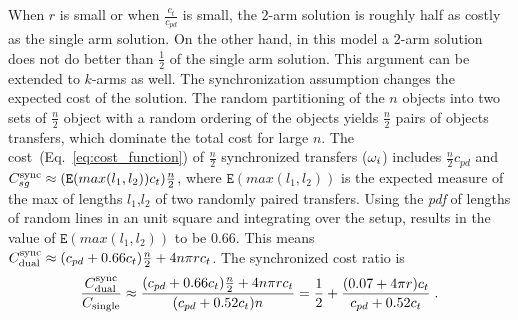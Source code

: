 When $r$ is small or when $\frac{c_t}{c_{pd}}$ is small, the $2$-arm 
solution is roughly half as costly as the single arm solution. On 
the other hand, in this model a $2$-arm solution does not do better than $\frac{1}{2}$ of 
the single arm 
solution. This argument can be extended to $k$-arms as well.
\vspace{-0.08in}
The synchronization assumption changes the expected cost of the solution. The random partitioning of the $n$ objects into two sets of $\frac{n}{2}$ object with a random ordering of the objects yields $\frac{n}{2}$ pairs of objects transfers, which dominate the total cost for large $n$. The cost~(Eq.~\ref{eq:cost_function}) of $\frac{n}{2}$ synchronized transfers (${\omega}_i$) includes $\frac{n}{2}c_{pd}$ and $C^{\rm sync}_{sg} \approx (\mathtt{E}(max(l_1,l_2))c_t)\frac{n}{2}$, where $\mathtt{E}(max(l_1,l_2))$ is the expected measure of the max of lengths $l_1$,$l_2$ of two randomly paired transfers. Using the \textit{pdf}\cite{ghosh1951random} of lengths of random lines in an unit square and integrating over the setup, results in the value of $\mathtt{E}(max(l_1,l_2))$ to be $0.66$. 
This means $C_{\rm dual}^{\rm sync} \approx (c_{pd} + 0.66c_t)\frac{n}{2} + 4n\pi rc_t$.
The synchronized cost ratio is
\vspace{-0.1in}
\begin{equation}\label{eq:synchronized-ratio}
\frac{C_{\rm dual}^{\rm sync}}{C_{\rm single}} \approx 
\frac{(c_{pd} + 0.66c_t)\frac{n}{2} + 4n\pi rc_t}{(c_{pd} + 0.52c_t)n}
= \frac{1}{2} + \frac{ (0.07 + 4\pi r)c_t}{c_{pd} + 0.52c_t}\;.
\vspace{-0.1in}
\end{equation}

